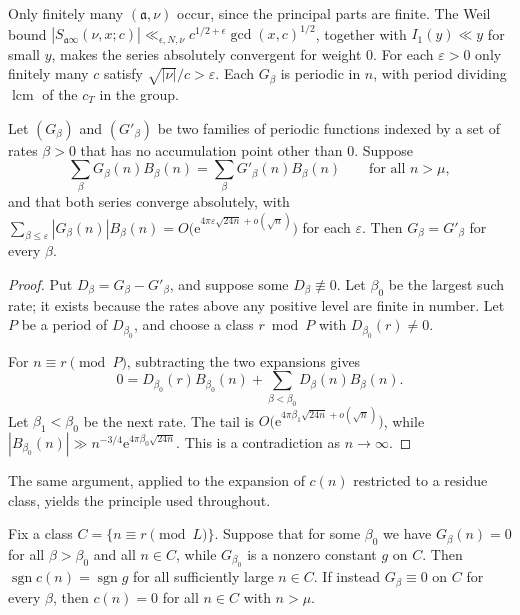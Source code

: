 \documentclass[11pt]{amsart}
\theoremstyle{definition}\newtheorem{definition}[theorem]{Definition}
\theoremstyle{remark}\newtheorem{remark}[theorem]{Remark}
\newcommand{\e}{\mathrm e}\newcommand{\Z}{\mathbb Z}\newcommand{\Q}{\mathbb Q}\newcommand{\C}{\mathbb C}
\newcommand{\sgn}{\operatorname{sgn}}\newcommand{\lcm}{\operatorname{lcm}}
\begin{document}
Only finitely many $(\mathfrak a,\nu)$ occur, since the principal parts are finite. The Weil bound $|S_{\mathfrak a\infty}(\nu,x;c)|\ll_{\epsilon,N,\nu} c^{1/2+\epsilon}\gcd(x,c)^{1/2}$, together with $I_1(y)\ll y$ for small $y$, makes the series absolutely convergent for weight $0$. For each $\varepsilon>0$ only finitely many $c$ satisfy $\sqrt{|\nu|}/c>\varepsilon$. Each $G_\beta$ is periodic in $n$, with period dividing $\lcm$ of the $c_T$ in the group.

\begin{lemma}[uniqueness]\label{lem:unique}
Let $(G_\beta)$ and $(G'_\beta)$ be two families of periodic functions indexed by a set of rates $\beta>0$ that has no accumulation point other than $0$. Suppose
\[
\sum_\beta G_\beta(n)B_\beta(n)=\sum_\beta G'_\beta(n)B_\beta(n)\qquad\text{for all } n>\mu,
\]
and that both series converge absolutely, with $\sum_{\beta\le\varepsilon}|G_\beta(n)|B_\beta(n)=O\big(\e^{4\pi\varepsilon\sqrt{24n}+o(\sqrt n)}\big)$ for each $\varepsilon$. Then $G_\beta=G'_\beta$ for every $\beta$.
\end{lemma}
\begin{proof}
Put $D_\beta=G_\beta-G'_\beta$, and suppose some $D_\beta\not\equiv0$. Let $\beta_0$ be the largest such rate; it exists because the rates above any positive level are finite in number. Let $P$ be a period of $D_{\beta_0}$, and choose a class $r\bmod P$ with $D_{\beta_0}(r)\ne0$.

For $n\equiv r\pmod P$, subtracting the two expansions gives
\[
0=D_{\beta_0}(r)B_{\beta_0}(n)+\sum_{\beta<\beta_0}D_\beta(n)B_\beta(n).
\]
Let $\beta_1<\beta_0$ be the next rate. The tail is $O\big(\e^{4\pi\beta_1\sqrt{24n}+o(\sqrt n)}\big)$, while $|B_{\beta_0}(n)|\gg n^{-3/4}\e^{4\pi\beta_0\sqrt{24n}}$. This is a contradiction as $n\to\infty$.
\end{proof}

The same argument, applied to the expansion of $c(n)$ restricted to a residue class, yields the principle used throughout.

\begin{corollary}\label{cor:decide}
Fix a class $C=\{n\equiv r\pmod L\}$. Suppose that for some $\beta_0$ we have $G_\beta(n)=0$ for all $\beta>\beta_0$ and all $n\in C$, while $G_{\beta_0}$ is a nonzero constant $g$ on $C$. Then $\sgn c(n)=\sgn g$ for all sufficiently large $n\in C$. If instead $G_\beta\equiv0$ on $C$ for every $\beta$, then $c(n)=0$ for all $n\in C$ with $n>\mu$.
\end{corollary}
\end{document}
